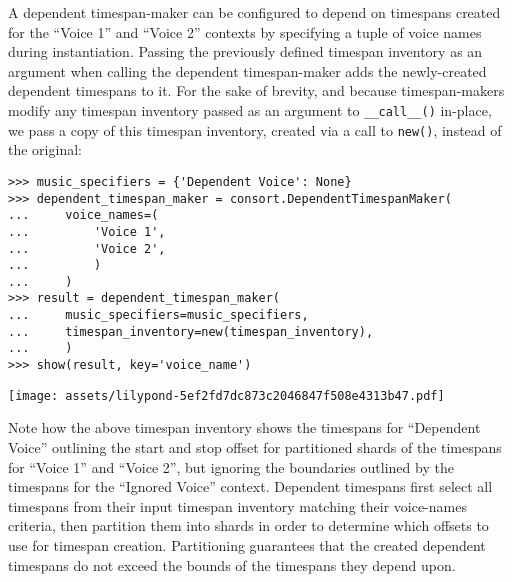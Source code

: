 \noindent A dependent timespan-maker can be configured to depend on timespans
created for the \enquote{Voice 1} and \enquote{Voice 2} contexts by specifying
a tuple of voice names during instantiation. Passing the previously defined
timespan inventory as an argument when calling the dependent timespan-maker
adds the newly-created dependent timespans to it. For the sake of brevity, and
because timespan-makers modify any timespan inventory passed as an argument to
\texttt{\_\_call\_\_()} in-place, we pass a copy of this timespan inventory,
created via a call to \texttt{new()}, instead of the original:

\begin{comment}
<abjad>
music_specifiers = {'Dependent Voice': None}
dependent_timespan_maker = consort.DependentTimespanMaker(
    voice_names=(
        'Voice 1',
        'Voice 2',
        )
    )
result = dependent_timespan_maker(
    music_specifiers=music_specifiers,
    timespan_inventory=new(timespan_inventory),
    )
show(result, key='voice_name')
</abjad>
\end{comment}

\begin{abjadbookoutput}
\begin{singlespacing}
\vspace{-0.5\baselineskip}
\begin{lstlisting}
>>> music_specifiers = {'Dependent Voice': None}
>>> dependent_timespan_maker = consort.DependentTimespanMaker(
...     voice_names=(
...         'Voice 1',
...         'Voice 2',
...         )
...     )
>>> result = dependent_timespan_maker(
...     music_specifiers=music_specifiers,
...     timespan_inventory=new(timespan_inventory),
...     )
>>> show(result, key='voice_name')
\end{lstlisting}
\noindent\texttt{[image: assets/lilypond-5ef2fd7dc873c2046847f508e4313b47.pdf]}
\end{singlespacing}
\end{abjadbookoutput}

\noindent Note how the above timespan inventory shows the timespans for
\enquote{Dependent Voice} outlining the start and stop offset for partitioned
shards of the timespans for \enquote{Voice 1} and \enquote{Voice 2}, but
ignoring the boundaries outlined by the timespans for the \enquote{Ignored
Voice} context. Dependent timespans first select all timespans from their input
timespan inventory matching their voice-names criteria, then partition them
into shards in order to determine which offsets to use for timespan creation.
Partitioning guarantees that the created dependent timespans do not exceed the
bounds of the timespans they depend upon.

